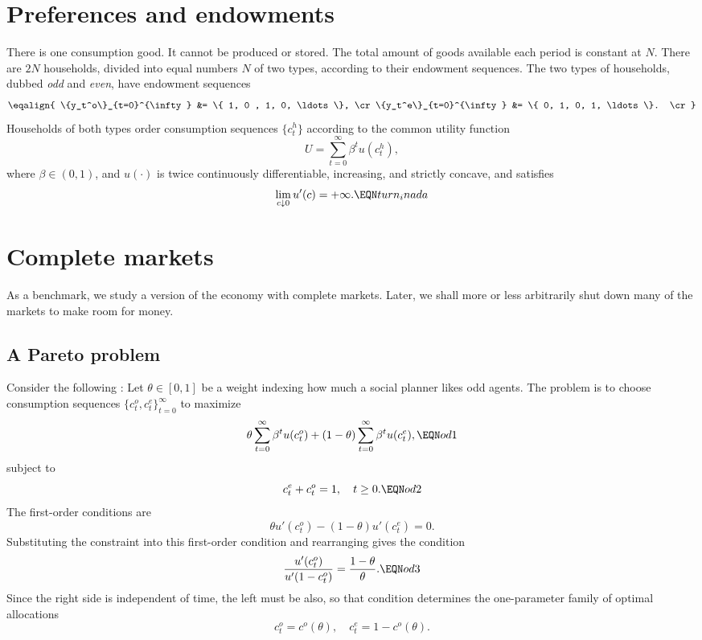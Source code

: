 \section{Preferences and endowments}

There is one consumption good.  It cannot be produced or stored.
The total amount of goods available each period
is constant at $N$.  There are $2N$ households, divided
into equal numbers $N$ of two types, according to their endowment
sequences.
   The two types of households, dubbed {\it odd} and {\it even}, have endowment sequences
$$ \eqalign{ \{y_t^o\}_{t=0}^{\infty} &= \{ 1, 0 , 1, 0, \ldots \}, \cr
             \{y_t^e\}_{t=0}^{\infty} &= \{ 0, 1, 0, 1, \ldots \}. \cr} $$
Households of both types order consumption sequences
$\{c_t^h\}$ according to the common utility function
$$ U = \sum_{t=0}^\infty \beta^t u(c_t^h),$$
where $\beta \in (0,1)$, and $u(\cdot)$ is twice continuously
differentiable, increasing, and strictly
concave, and satisfies
$$ \lim_{c \downarrow 0} u'(c) = +\infty.             \EQN turn_inada
$$

\section{Complete markets}

As a benchmark, we study a version of the economy with complete markets.
Later, we shall more or less arbitrarily shut down many
of the markets  to make room for money.

\subsection{A Pareto problem}

Consider the following :  Let $\theta \in [0,1]$
be a weight indexing how much a social planner likes
odd agents.  The problem is to choose consumption
sequences $\{c_t^o, c_t^e\}_{t=0}^\infty$ to maximize
$$ \theta \sum_{t=0}^\infty \beta^t u(c_t^o) +
  (1-\theta) \sum_{t=0}^\infty \beta^t u(c_t^e), \EQN od1$$
subject to
$$ c_t^e + c_t^o = 1, \quad t \geq 0.\EQN od2$$
The first-order conditions are
$$ \theta u'(c_t^o) - (1-\theta) u'(c_t^e) = 0.$$
Substituting the constraint  into this first-order
condition and rearranging gives the condition
$$ { u'(c_t^o)\over u'(1-c_t^o)} = {1 - \theta \over \theta}.\EQN od3$$
Since the right side is independent of time, the left must be also, so that condition  determines the one-parameter family
of
optimal allocations
$$ c_t^o = c^o (\theta), \quad c_t^e = 1-c^o(\theta).$$

